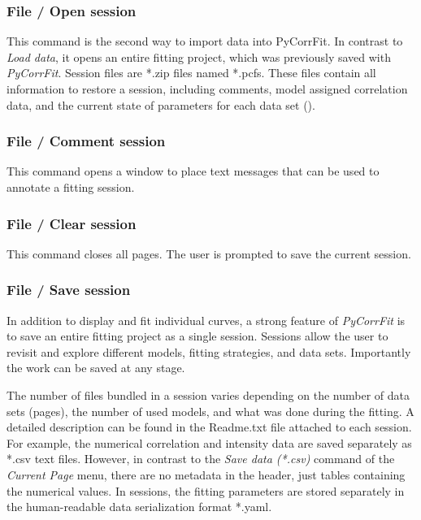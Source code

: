 \subsubsection{File / Open session}
\label{sec:menub.filem.opens}
This command is the second way to import data into PyCorrFit. In contrast to \textit{Load data}, it opens an entire fitting project, which was previously saved with \textit{PyCorrFit}. Session files are *.zip files named *.pcfs. These files contain all information to restore a session, including comments, model assigned correlation data, and the current state of parameters for each data set ().

\subsubsection{File / Comment session}
\label{sec:menub.filem.comme}
This command opens a window to place text messages that can be used to annotate a fitting session.

\subsubsection{File / Clear session}
\label{sec:menub.filem.clear}
This command closes all pages. The user is prompted to save the current session.

\subsubsection{File / Save session}
\label{sec:menub.filem.saves}
In addition to display and fit individual curves, a strong feature of \textit{PyCorrFit} is to save an entire fitting project as a single session. Sessions allow the user to revisit and explore different models, fitting strategies, and data sets. Importantly the work can be saved at any stage.

The number of files bundled in a session varies depending on the number of data sets (pages), the number of used models, and what was done during the fitting. A detailed description can be found in the Readme.txt file attached to each session. For example, the numerical correlation and intensity data are saved separately as *.csv text files. However, in contrast to the \textit{Save data (*.csv)} command of the \textit{Current Page} menu, there are no metadata in the header, just tables containing the numerical values. In sessions, the fitting parameters are stored separately in the human-readable data serialization format *.yaml.

